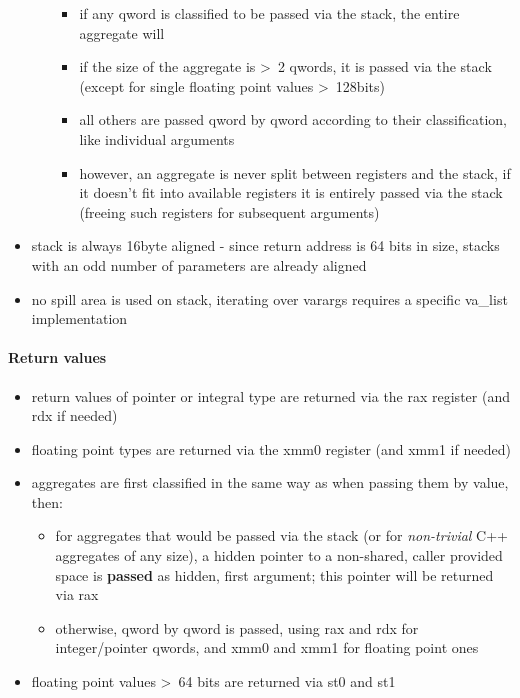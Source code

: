 \begin{itemize}
\begin{itemize}
\begin{itemize}
    \item if any qword is classified to be passed via the stack, the entire aggregate will
    \item if the size of the aggregate is \textgreater\ 2 qwords, it is passed via the stack (except for single floating point values \textgreater\ 128bits)
    \item all others are passed qword by qword according to their classification, like individual arguments
	\item however, an aggregate is never split between registers and the stack, if it doesn't fit into available registers it is entirely passed via the stack (freeing such registers for subsequent arguments)
  \end{itemize}
\end{itemize}
\item stack is always 16byte aligned - since return address is 64 bits in size, stacks with an odd number of parameters are
already aligned
\item no spill area is used on stack, iterating over varargs requires a specific va\_list implementation
\end{itemize}


\paragraph{Return values}

\begin{itemize}
\item return values of pointer or integral type are returned via the rax register (and rdx if needed)
\item floating point types are returned via the xmm0 register (and xmm1 if needed)
\item aggregates are first classified in the same way as when passing them by value, then:
\begin{itemize}
  \item for aggregates that would be passed via the stack (or for {\it non-trivial} C++ aggregates of any size), a hidden pointer to a non-shared,
  caller provided space is {\bf passed} as hidden, first argument; this pointer will be returned via rax
  \item otherwise, qword by qword is passed, using rax and rdx for integer/pointer qwords, and xmm0 and xmm1 for floating point ones
\end{itemize}
\item floating point values \textgreater\ 64 bits are returned via st0 and st1
\end{itemize}


